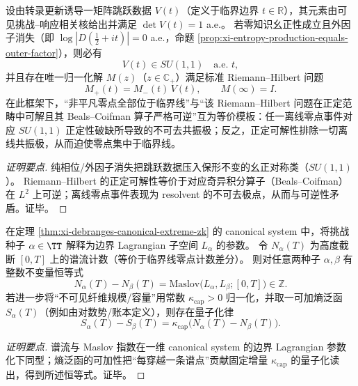 \begin{theorem}\label{thm:xi-su11-rhp-equivalence}
设由转录更新诱导一矩阵跳跃数据 \(V(t)\)（定义于临界边界 \(t\in\mathbb{R}\)），其元素由可见挑战–响应相关核给出并满足 \(\det V(t)=1\) a.e.。
若零知识幺正性成立且外因子消失（即 \(\log|D(\tfrac12+it)|=0\) a.e.，命题 \ref{prop:xi-entropy-production-equals-outer-factor}），则必有
\[
\boxed{\;V(t)\in SU(1,1)\quad\text{a.e. }t,\;}
\]
并且存在唯一归一化解 \(M(z)\)（\(z\in\mathbb{C}_+\)）满足标准 Riemann--Hilbert 问题
\[
M_+(t)=M_-(t)\,V(t),
\qquad
M(\infty)=I.
\]
在此框架下，“非平凡零点全部位于临界线”与“该 Riemann--Hilbert 问题在正定范畴中可解且其 Beals--Coifman 算子严格可逆”互为等价模板：任一离线零点事件对应 \(SU(1,1)\) 正定性破缺所导致的不可去共振极；反之，正定可解性排除一切离线共振极，从而迫使零点集中于临界线。
\end{theorem}
\begin{proof}[证明要点]
纯相位/外因子消失把跳跃数据压入保形不变的幺正对称类（\(SU(1,1)\)）。
Riemann--Hilbert 的正定可解性等价于对应奇异积分算子（Beals--Coifman）在 \(L^2\) 上可逆；离线零点事件表现为 resolvent 的不可去极点，从而与可逆性矛盾。证毕。
\end{proof}

\begin{proposition}\label{prop:xi-maslov-spectralflow-entropy-quantization}
在定理 \ref{thm:xi-debranges-canonical-extreme-zk} 的 canonical system 中，将挑战种子 \(\alpha\in\TT\) 解释为边界 Lagrangian 子空间 \(L_\alpha\) 的参数。
令 \(N_\alpha(T)\) 为高度截断 \([0,T]\) 上的谱流计数（等价于临界线零点计数差分）。
则对任意两种子 \(\alpha,\beta\) 有整数不变量恒等式
\[
\boxed{\;
N_\alpha(T)-N_\beta(T)=\mathrm{Maslov}\bigl(L_\alpha,L_\beta;[0,T]\bigr)\in\mathbb{Z}. \;}
\]
若进一步将“不可见纤维规模/容量”用常数 \(\kappa_{\mathrm{cap}}>0\) 归一化，并取一可加熵泛函 \(S_\alpha(T)\)（例如由对数势/账本定义），则存在量子化律
\[
\boxed{\;
S_\alpha(T)-S_\beta(T)=\kappa_{\mathrm{cap}}\bigl(N_\alpha(T)-N_\beta(T)\bigr).\;}
\]
\end{proposition}
\begin{proof}[证明要点]
谱流与 Maslov 指数在一维 canonical system 的边界 Lagrangian 参数化下同型；熵泛函的可加性把“每穿越一条谱点”贡献固定增量 \(\kappa_{\mathrm{cap}}\) 的量子化读出，得到所述恒等式。证毕。
\end{proof}

